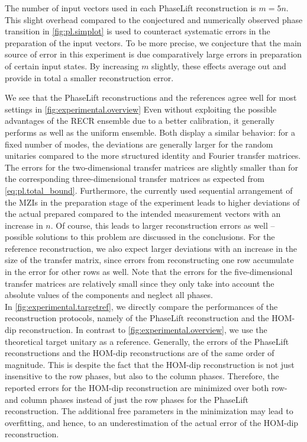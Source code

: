 The number of input vectors used in each PhaseLift reconstruction is $m = 5n$.
This slight overhead compared to the conjectured and numerically observed phase transition in \cref{fig:pl.simplot} is used to counteract systematic errors in the preparation of the input vectors.
To be more precise, we conjecture that the main source of error in this experiment is due comparatively large errors in preparation of certain input states.
By increasing $m$ slightly, these effects average out and provide in total a smaller reconstruction error.

We see that the PhaseLift reconstructions and the references agree well for most settings in \cref{fig:experimental.overview}
Even without exploiting the possible advantages of the RECR ensemble due to a better calibration, it generally performs as well as the uniform ensemble.
Both display a similar behavior: for a fixed number of modes, the deviations are generally larger for the random unitaries compared to the more structured identity and Fourier transfer matrices.
The errors for the two-dimensional transfer matrices are slightly smaller than for the corresponding three-dimensional transfer matrices as expected from \cref{eq:pl.total_bound}.
Furthermore, the currently used sequential arrangement of the MZIs in the preparation stage of the experiment leads to higher deviations of the actual prepared compared to the intended measurement vectors with an increase in $n$.
Of course, this leads to larger reconstruction errors as well -- possible solutions to this problem are discussed in the conclusions.
For the reference reconstruction, we also expect larger deviations with an increase in the size of the transfer matrix, since errors from reconstructing one row accumulate in the error for other rows as well.
Note that the errors for the five-dimensional transfer matrices are relatively small since they only take into account the absolute values of the components and neglect all phases.\\



In \cref{fig:experimental.targetref}, we directly compare the performances of the reconstruction protocols, namely of the PhaseLift reconstruction and the HOM-dip reconstruction.
In contrast to \cref{fig:experimental.overview}, we use the theoretical target unitary as a reference.
Generally, the errors of the PhaseLift reconstructions and the HOM-dip reconstructions are of the same order of magnitude.
This is despite the fact that the HOM-dip reconstruction is not just insensitive to the row phases, but also to the column phases.
Therefore, the reported errors for the HOM-dip reconstruction are minimized over both row- and column phases instead of just the row phases for the PhaseLift reconstruction.
The additional free parameters in the minimization may lead to overfitting, and hence, to an underestimation of the actual error of the HOM-dip reconstruction.\\


